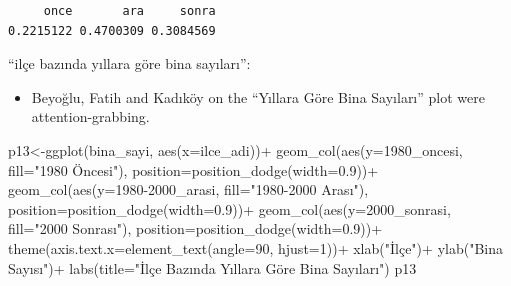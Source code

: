 \documentclass[
  11pt,
  a4paper,
  DIV=11,
  numbers=noendperiod]{scrartcl}
\newenvironment{Shaded}{\begin{snugshade}}{\end{snugshade}}
\newcommand{\AttributeTok}[1]{\textcolor[rgb]{0.40,0.45,0.13}{#1}}
\newcommand{\DecValTok}[1]{\textcolor[rgb]{0.68,0.00,0.00}{#1}}
\newcommand{\FloatTok}[1]{\textcolor[rgb]{0.68,0.00,0.00}{#1}}
\newcommand{\FunctionTok}[1]{\textcolor[rgb]{0.28,0.35,0.67}{#1}}
\newcommand{\NormalTok}[1]{\textcolor[rgb]{0.00,0.23,0.31}{#1}}
\newcommand{\OtherTok}[1]{\textcolor[rgb]{0.00,0.23,0.31}{#1}}
\newcommand{\SpecialCharTok}[1]{\textcolor[rgb]{0.37,0.37,0.37}{#1}}
\newcommand{\StringTok}[1]{\textcolor[rgb]{0.13,0.47,0.30}{#1}}
\providecommand{\tightlist}{%
  \setlength{\itemsep}{0pt}\setlength{\parskip}{0pt}}\usepackage{longtable,booktabs,array}
\begin{document}
\begin{verbatim}
     once       ara     sonra 
0.2215122 0.4700309 0.3084569 
\end{verbatim}

``ilçe bazında yıllara göre bina sayıları'':

\begin{itemize}
\tightlist
\item
  Beyoğlu, Fatih and Kadıköy on the ``Yıllara Göre Bina Sayıları'' plot
  were attention-grabbing.
\end{itemize}

\begin{Shaded}
\begin{Highlighting}[]
\NormalTok{p13}\OtherTok{\textless{}{-}}\FunctionTok{ggplot}\NormalTok{(bina\_sayi, }\FunctionTok{aes}\NormalTok{(}\AttributeTok{x=}\NormalTok{ilce\_adi))}\SpecialCharTok{+}
  \FunctionTok{geom\_col}\NormalTok{(}\FunctionTok{aes}\NormalTok{(}\AttributeTok{y=}\StringTok{\textasciigrave{}}\AttributeTok{1980\_oncesi}\StringTok{\textasciigrave{}}\NormalTok{, }\AttributeTok{fill=}\StringTok{"1980 Öncesi"}\NormalTok{), }\AttributeTok{position=}\FunctionTok{position\_dodge}\NormalTok{(}\AttributeTok{width=}\FloatTok{0.9}\NormalTok{))}\SpecialCharTok{+}
  \FunctionTok{geom\_col}\NormalTok{(}\FunctionTok{aes}\NormalTok{(}\AttributeTok{y=}\StringTok{\textasciigrave{}}\AttributeTok{1980{-}2000\_arasi}\StringTok{\textasciigrave{}}\NormalTok{, }\AttributeTok{fill=}\StringTok{"1980{-}2000 Arası"}\NormalTok{), }\AttributeTok{position=}\FunctionTok{position\_dodge}\NormalTok{(}\AttributeTok{width=}\FloatTok{0.9}\NormalTok{))}\SpecialCharTok{+}
  \FunctionTok{geom\_col}\NormalTok{(}\FunctionTok{aes}\NormalTok{(}\AttributeTok{y=}\StringTok{\textasciigrave{}}\AttributeTok{2000\_sonrasi}\StringTok{\textasciigrave{}}\NormalTok{, }\AttributeTok{fill=}\StringTok{"2000 Sonrası"}\NormalTok{), }\AttributeTok{position=}\FunctionTok{position\_dodge}\NormalTok{(}\AttributeTok{width=}\FloatTok{0.9}\NormalTok{))}\SpecialCharTok{+}
  \FunctionTok{theme}\NormalTok{(}\AttributeTok{axis.text.x=}\FunctionTok{element\_text}\NormalTok{(}\AttributeTok{angle=}\DecValTok{90}\NormalTok{, }\AttributeTok{hjust=}\DecValTok{1}\NormalTok{))}\SpecialCharTok{+}
  \FunctionTok{xlab}\NormalTok{(}\StringTok{"İlçe"}\NormalTok{)}\SpecialCharTok{+}
  \FunctionTok{ylab}\NormalTok{(}\StringTok{"Bina Sayısı"}\NormalTok{)}\SpecialCharTok{+}
  \FunctionTok{labs}\NormalTok{(}\AttributeTok{title=}\StringTok{"İlçe Bazında Yıllara Göre Bina Sayıları"}\NormalTok{)}
\NormalTok{p13}
\end{Highlighting}
\end{Shaded}
\end{document}
